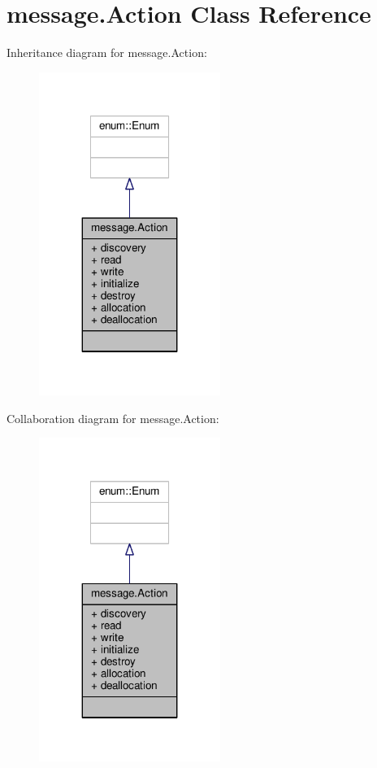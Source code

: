 \hypertarget{classmessage_1_1Action}{}\section{message.\+Action Class Reference}
\label{classmessage_1_1Action}


Inheritance diagram for message.\+Action\+:
\nopagebreak
\begin{figure}[H]
\begin{center}
\leavevmode
\includegraphics[width=167pt]{classmessage_1_1Action__inherit__graph}
\end{center}
\end{figure}


Collaboration diagram for message.\+Action\+:
\nopagebreak
\begin{figure}[H]
\begin{center}
\leavevmode
\includegraphics[width=167pt]{classmessage_1_1Action__coll__graph}
\end{center}
\end{figure}
